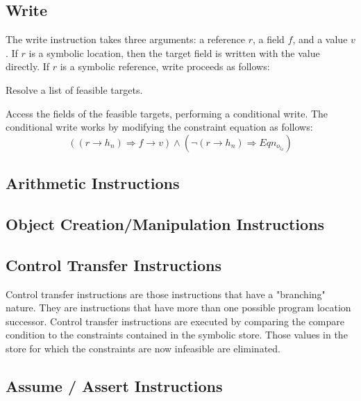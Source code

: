 \subsection{Write}
The write instruction takes three arguments: a reference $r$, a field $f$, and a value $v$. If $r$ is a symbolic location, then the target field is written with the value directly. If $r$ is a symbolic reference, write proceeds as follows:
\begin{compactenum}
\item Resolve a list of feasible targets.
\item Access the fields of the feasible targets, performing a conditional write. The conditional write works by modifying the constraint equation as follows:
\begin{equation}
  ((r\rightarrow h_n) \Rightarrow f\rightarrow v)  \wedge (\lnot (r\rightarrow h_n) \Rightarrow Eqn_o_l_d)
\end{equation}
\end{compactenum}

\subsection{Arithmetic Instructions}
\subsection{Object Creation/Manipulation Instructions}
\subsection{Control Transfer Instructions}
Control transfer instructions are those instructions that have a "branching" nature. They are instructions that have more than one possible program location successor. Control transfer instructions are executed by comparing the compare condition to the constraints contained in the symbolic store. Those values in the store for which the constraints are now infeasible are eliminated. 
\subsection{Assume / Assert Instructions}